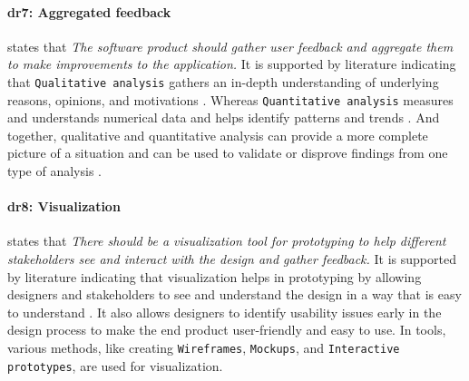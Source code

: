 \paragraph{\ac{dr}7: Aggregated feedback} states that \textit{The software product should gather user feedback and aggregate them to make improvements to the application.} 
It is supported by literature indicating that \texttt{Qualitative analysis} gathers an in-depth understanding of underlying reasons, opinions, and motivations \cite{misc:dsr:mayring}.
Whereas \texttt{Quantitative analysis} measures and understands numerical data and helps identify patterns and trends \cite{article:qqa:young}.
And together, qualitative and quantitative analysis can provide a more complete picture of a situation and can be used to validate or disprove findings from one type of analysis \cite{article:qq:helena}.

\paragraph{\ac{dr}8: Visualization} states that \textit{There should be a visualization tool for prototyping to help different stakeholders see and interact with the design and gather feedback.} 
It is supported by literature indicating that visualization helps in prototyping by allowing designers and stakeholders to see and understand the design in a way that is easy to understand \cite{article:comparative:prototypes}.
It also allows designers to identify usability issues \cite{article:prototyping:gould} early in the design process to make the end product user-friendly and easy to use.
In tools, various methods, like creating \texttt{Wireframes}, \texttt{Mockups}, and \texttt{Interactive prototypes}, are used for visualization.


